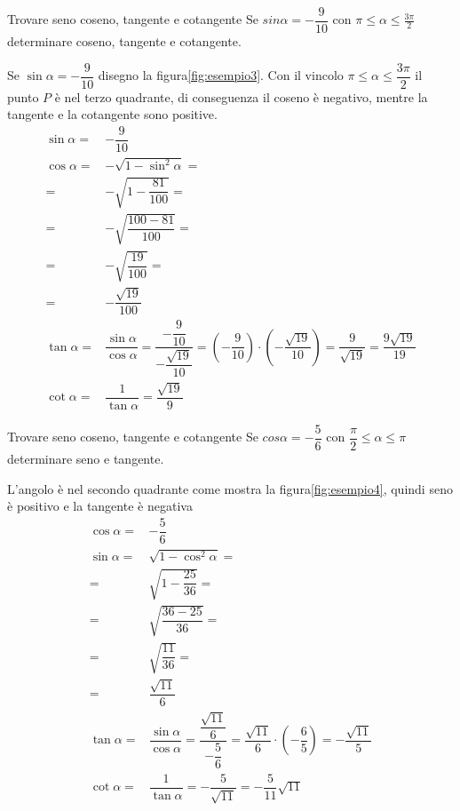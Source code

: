\begin{esempiot}{Trovare seno coseno, tangente e cotangente}{}
	Se $sin\alpha=-\dfrac{9}{10}$ con $\pi\leq\alpha\leq\frac{3\pi}{2}$ determinare coseno, tangente e cotangente.
\end{esempiot}
Se $\sin\alpha=-\dfrac{9}{10}$ disegno la figura\nobs\vref{fig:esempio3}. Con il vincolo $\pi\leq\alpha\leq\dfrac{3\pi}{2}$ il punto $P$ è nel terzo quadrante, di conseguenza il coseno è negativo, mentre  la tangente e la cotangente sono positive.
\begin{align*}
\sin\alpha=&-\dfrac{9}{10}\\
\cos\alpha=&-\sqrt{1-\sin^2\alpha}=\\
=&-\sqrt{1-\dfrac{81}{100}}=\\
=&-\sqrt{\dfrac{100-81}{100}}=\\
=&-\sqrt{\dfrac{19}{100}}=\\
=&-\dfrac{\sqrt{19}}{100}\\
\tan\alpha=&\dfrac{\sin\alpha}{\cos\alpha}=\dfrac{-\dfrac{9}{10}}{-\dfrac{\sqrt{19}}{10}}=\left(-\dfrac{9}{10}\right)\cdot\left(-\dfrac{\sqrt{19}}{10}\right)=\dfrac{9}{\sqrt{19}}=\dfrac{9\sqrt{19}}{19}\\
\cot\alpha=&\dfrac{1}{\tan\alpha}=\dfrac{\sqrt{19}}{9}
\end{align*}
\begin{esempiot}{Trovare seno coseno, tangente e cotangente}{}
	Se $cos\alpha=-\dfrac{5}{6}$ con $\dfrac{\pi}{2}\leq\alpha\leq \pi$ determinare seno e tangente.
\end{esempiot}
L'angolo è nel secondo quadrante come  mostra la figura\nobs\vref{fig:esempio4}, quindi seno è positivo e la tangente è negativa
\begin{align*}
\cos\alpha=&-\dfrac{5}{6}\\
\sin\alpha=&\sqrt{1-\cos^2\alpha}=\\
=&\sqrt{1-\dfrac{25}{36}}=\\
=&\sqrt{\dfrac{36-25}{36}}=\\
=&\sqrt{\dfrac{11}{36}}=\\
=&\dfrac{\sqrt{11}}{6}\\
\tan\alpha=&\dfrac{\sin\alpha}{\cos\alpha}=\dfrac{\dfrac{\sqrt{11}}{6}}{-\dfrac{5}{6}}=\dfrac{\sqrt{11}}{6}\cdot\left(-\dfrac{6}{5}\right)=-\dfrac{\sqrt{11}}{5}\\
\cot\alpha=&\dfrac{1}{\tan\alpha}=-\dfrac{5}{\sqrt{11}}=-\dfrac{5}{11}\sqrt{11}
\end{align*}
